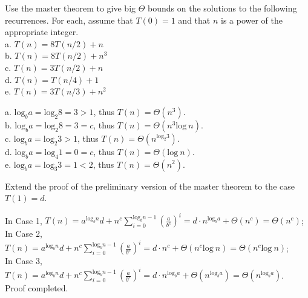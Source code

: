 \documentclass[11pt, a4paper, UTF8]{ctexart}
\begin{document}
\begin{problem}[CS: 4.4.1]
  Use the master theorem to give big $\Theta$ bounds on the solutions to 
  the following recurrences. For each, assume that $T(0) = 1$ and that $n$ 
  is a power of the appropriate integer.\\
  a. $T(n) = 8T(n/2) + n$\\
  b. $T(n) = 8T(n/2) + n^{3}$\\
  c. $T(n) = 3T(n/2) + n$\\
  d. $T(n) = T(n/4) + 1$\\
  e. $T(n) = 3T(n/3) + n^{2}$
\end{problem}

\begin{solution}
  a. $\text{log}_{b}a = \text{log}_{2}8 = 3 > 1$, thus $T(n) = \Theta (n^{3})$.\\
  b. $\text{log}_{b}a = \text{log}_{2}8 = 3 = c$, thus $T(n) = \Theta (n^{3}\text{log}~n)$.\\
  c. $\text{log}_{b}a = \text{log}_{2}3 > 1$, thus $T(n) = \Theta (n^{\text{log}_{2}3})$.\\
  d. $\text{log}_{b}a = \text{log}_{4}1 = 0 = c$, thus $T(n) = \Theta (\text{log}~n)$.\\
  e. $\text{log}_{b}a = \text{log}_{3}3 = 1 < 2$, thus $T(n) = \Theta (n^{2})$.
\end{solution}

\begin{problem}[CS: 4.4.6]
  Extend the proof of the preliminary version of the master theorem to the 
  case $T(1) = d$.
\end{problem}

\begin{solution}
  In Case 1, $T(n) = a^{\text{log}_{b}n}d + n^{c}\sum_{i = 0}^{\text{log}_{b}n - 1} (\frac{a}{b^{c}})^{i} 
  = d\cdot n^{\text{log}_{b}a} + \Theta (n^{c}) = \Theta (n^{c})$;\\
  In Case 2, $T(n) = a^{\text{log}_{b}n}d + n^{c}\sum_{i = 0}^{\text{log}_{b}n - 1} (\frac{a}{b^{c}})^{i} 
  = d\cdot n^{c} + \Theta (n^{c} \text{log}~n) = \Theta (n^{c} \text{log}~n)$;\\
  In Case 3, $T(n) = a^{\text{log}_{b}n}d + n^{c}\sum_{i = 0}^{\text{log}_{b}n - 1} (\frac{a}{b^{c}})^{i} 
  = d\cdot n^{\text{log}_{b}a} + \Theta (n^{\text{log}_{b}a}) = \Theta (n^{\text{log}_{b}a})$.\\
  Proof completed.
\end{solution}
\end{document}
